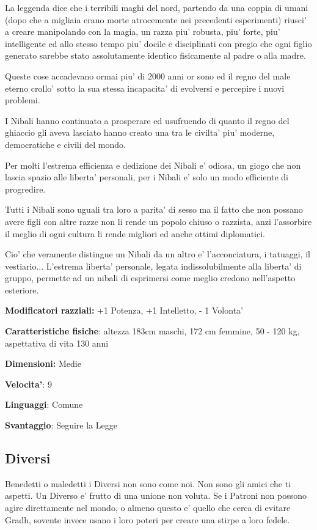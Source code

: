 \documentclass[a4paper,11pt,twoside,openany]{book}
\begin{document}
La leggenda dice che i terribili maghi del nord, partendo da una coppia di umani (dopo che a migliaia erano morte atrocemente nei precedenti esperimenti) riusci' a creare manipolando con la magia, un razza piu' robusta, piu' forte, piu' intelligente ed allo stesso tempo piu' docile e disciplinati con pregio che ogni figlio generato sarebbe stato assolutamente identico fisicamente al padre o alla madre.

Queste cose accadevano ormai piu' di 2000 anni or sono ed il regno del male eterno crollo' sotto la sua stessa incapacita' di evolversi e percepire i nuovi problemi.

I Nibali hanno continuato a prosperare ed usufruendo di quanto il regno del ghiaccio gli aveva lasciato hanno creato una tra le civilta' piu' moderne, democratiche e civili del mondo.

Per molti l'estrema efficienza e dedizione dei Nibali e' odiosa, un giogo che non lascia spazio alle liberta' personali, per i Nibali e' solo un modo efficiente di progredire.

Tutti i Nibali sono uguali tra loro a parita' di sesso ma il fatto che non possano avere figli con altre razze non li rende un popolo chiuso o razzista, anzi l'assorbire il meglio di ogni cultura li rende migliori ed anche ottimi diplomatici. 

Cio' che veramente distingue un Nibali da un altro e' l'acconciatura, i tatuaggi, il vestiario... L'estrema liberta' personale, legata indissolubilmente alla liberta' di gruppo, permette ad un nibali di esprimersi come meglio credono nell'aspetto esteriore.

\textbf{Modificatori razziali:} +1 Potenza, +1 Intelletto, - 1 Volonta'

\textbf{Caratteristiche fisiche}: altezza 183cm maschi, 172 cm femmine, 50 - 120 kg, aspettativa di vita 130 anni

\textbf{Dimensioni:} Medie

\textbf{Velocita'}: 9

\textbf{Linguaggi}: Comune

\textbf{Svantaggio}: Seguire la Legge

\subsection{Diversi}

\label{diversi}

Benedetti o maledetti i Diversi non sono come noi. Non sono gli amici che ti aspetti. Un Diverso e' frutto di una unione non voluta. Se i Patroni non possono agire direttamente nel mondo, o almeno questo e' quello che cerca di evitare Gradh, sovente invece usano i loro poteri per creare una stirpe a loro fedele.
\end{document}
